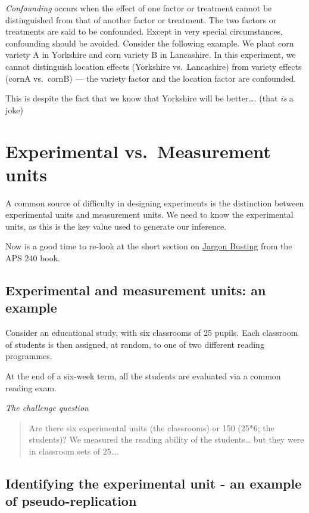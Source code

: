 \documentclass[
]{book}
\begin{document}
\emph{Confounding} occurs when the effect of one factor or treatment cannot be distinguished from that of another factor or treatment. The two factors or treatments are said to be confounded. Except in very special circumstances, confounding should be avoided. Consider the following example. We plant corn variety A in Yorkshire and corn variety B in Lancashire. In this experiment, we cannot distinguish location effects (Yorkshire vs.~Lancashire) from variety effects (cornA vs.~cornB) --- the variety factor and the location factor are confounded.

This is despite the fact that we know that Yorkshire will be better\ldots. (that \emph{is} a joke)

\section{Experimental vs.~Measurement units}\label{experimental-vs.-measurement-units}

A common source of difficulty in designing experiments is the distinction between experimental units and measurement units. We need to know the experimental units, as this is the key value used to generate our inference.

Now is a good time to re-look at the short section on \href{https://dzchilds.github.io/stats-for-bio/principles-experimental-design.html\#jargon-busting}{Jargon Busting} from the APS 240 book.

\subsection{Experimental and measurement units: an example}\label{experimental-and-measurement-units-an-example}

Consider an educational study, with six classrooms of 25 pupils. Each classroom of students is then assigned, at random, to one of two different reading programmes.

At the end of a six-week term, all the students are evaluated via a common reading exam.

\emph{The challenge question}

\begin{quote}
Are there six experimental units (the classrooms) or 150 (25*6; the students)? We measured the reading ability of the students\ldots{} but they were in classroom sets of 25\ldots.
\end{quote}

\subsection{\texorpdfstring{Identifying the experimental unit - an example of \textbf{pseudo-replication}}{Identifying the experimental unit - an example of pseudo-replication}}\label{identifying-the-experimental-unit---an-example-of-pseudo-replication}
\end{document}
